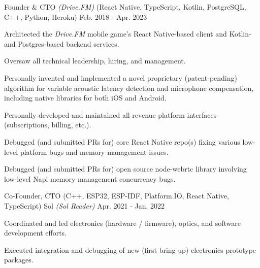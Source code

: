 \begin{cventries}
  \cventry
    {{\color{awesome}Founder \& CTO} \textit{(Drive.FM)} (React Native, TypeScript, Kotlin, PostgreSQL, C++, Python, Heroku)} %
    {} %
    {} %
    {Feb. 2018 - Apr. 2023} %
    { %
      \begin{cvitems}
        \item {Architected the \textit{Drive.FM} mobile game’s React Native-based client and Kotlin- and Postgres-based backend services.}
        \item {Oversaw all technical leadership, hiring, and management.}
        \item {Personally invented and implemented a novel proprietary (patent-pending) algorithm for variable acoustic latency detection and microphone compensation, including native libraries for both iOS and Android.}
        \item {Personally developed and maintained all revenue platform interfaces (subscriptions, billing, etc.).}
        \item {Debugged (and submitted PRs for) core React Native repo(s) fixing various low-level platform bugs and memory management issues.}
        \item {Debugged (and submitted PRs for) open source node-webrtc library involving low-level Napi memory management concurrency bugs.}
      \end{cvitems}
    }


  \cventry
    {{\color{awesome}Co-Founder, CTO} (C++, ESP32, ESP-IDF, Platform.IO, React Native, TypeScript)} %
    {Sol \textit{(Sol Reader)}} %
    {} %
    {Apr. 2021 - Jan. 2022} %
    { %
      \begin{cvitems}
        \item {Coordinated and led electronics (hardware / firmware), optics, and software development efforts.}
        \item {Executed integration and debugging of new (first bring-up) electronics prototype packages.}
      \end{cvitems}
    }



\end{cventries}
